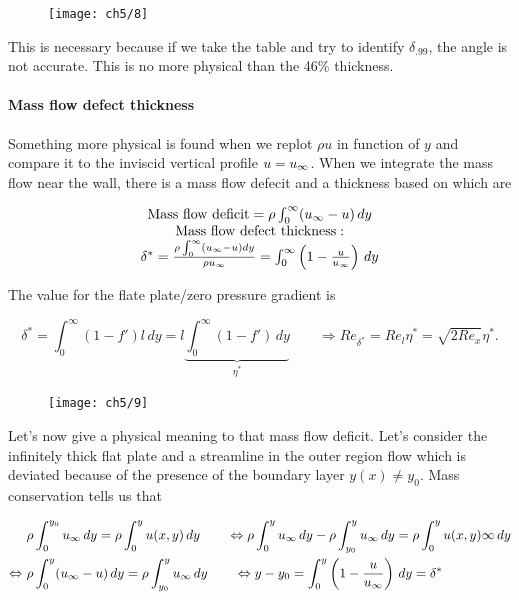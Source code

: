			\begin{figure}
			\vspace{0mm}
			\texttt{[image: ch5/8]}
			\label{fig:5.8}
			\end{figure}
			This is necessary because if we take the table and try to identify $\delta _{.99}$, the angle is not accurate. This is no more physical than the 46\% thickness. 
			
			\paragraph{Mass flow defect thickness} Something more physical is found when we replot $\rho u$ in function of $y$ and compare it to the inviscid vertical profile $u = u_\infty$. When we integrate the mass flow near the wall, there is a mass flow defecit and a thickness based on which are
			
			\begin{equation}
			\begin{array}{c}
				\mbox{Mass flow deficit} = \rho \int _0 ^\infty (u_\infty - u)\, dy \\
				\mbox{Mass flow defect thickness}:\\
				 \delta ^* = \frac{\rho \int _0 ^\infty (u_\infty - u) dy }{\rho u_\infty} = \int _0 ^\infty \left( 1-\frac{u}{u_\infty} \right)\, dy
			\end{array}
			\end{equation}
			
			The value for the flate plate/zero pressure gradient is 
			
			\begin{equation}
				\delta ^* = \int _0^\infty (1- f') l\, dy = l\underbrace{\int _0^\infty (1-f') \, dy}_{\eta ^*}\qquad \Rightarrow Re_{\delta ^*} = Re_{l}\eta ^* = \sqrt{2Re_x}\eta ^* .
			\end{equation}
			
			\begin{figure}
			\vspace{-5mm}
			\texttt{[image: ch5/9]}
			\label{fig:5.9}
			\end{figure}
			Let's now give a physical meaning to that mass flow deficit. Let's consider the infinitely thick flat plate and a streamline in the outer region flow which is deviated because of the presence of the boundary layer $y(x) \neq y_0$. Mass conservation tells us that 
			
			\begin{equation}
			\begin{aligned}
				&\rho \int _0^{y_0} u_\infty \, dy =  \rho \int _0^y u(x,y) \, dy \qquad \Leftrightarrow \rho \int _0^{y} u_\infty \, dy - \rho \int _{y_0}^{y} u_\infty \, dy = \rho \int _0^y u(x,y)\infty \, dy \\
				\Leftrightarrow \ &\rho \int _0^{y} (u_\infty - u) \, dy = \rho \int _{y_0}^{y} u_\infty \, dy \qquad \Leftrightarrow y-y_0 = \int _0^{y} \left(1 -\frac{u}{u_\infty}\right)\, dy = \delta ^*
			\end{aligned}
			\end{equation}
			
